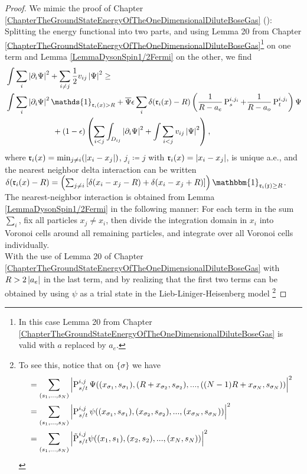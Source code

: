\begin{proof}
	We mimic the proof of Chapter \ref{ChapterTheGroundStateEnergyOfTheOneDimensionalDiluteBoseGas} (\cite{agerskov2022ground}): Splitting the energy functional into two parts, and using Lemma 20 from Chapter \ref{ChapterTheGroundStateEnergyOfTheOneDimensionalDiluteBoseGas}\footnote{In this case Lemma 20 from Chapter \ref{ChapterTheGroundStateEnergyOfTheOneDimensionalDiluteBoseGas} is valid with $a$ replaced by $a_e$.} on one term and Lemma \ref{LemmaDysonSpin1/2Fermi} on the other, we find 
	\begin{equation}
	\begin{aligned}
	&\int \sum_{i}\abs{\partial_i\Psi}^2+\sum_{i\neq j} \frac{1}{2}v_{ij}\abs{\Psi}^2\geq\\ &\int\sum_{i}\abs{\partial_i\Psi}^2\mathds{1}_{\mathfrak{r}_i(x)>R}+\overline{\Psi}\epsilon\sum_{i}\delta(\mathfrak{r}_i(x)-R)\left(\frac{1}{R-a_e}\operatorname{P}_s^{i,j_i}+\frac{1}{R-a_o}\operatorname{P}_t^{i,j_i}\right)\Psi\\&\qquad\qquad\qquad+ (1-\epsilon)\left(\sum_{i<j}\int_{D_{ij}}\abs{\partial_i \Psi}^2+\int\sum_{i<j} v_{ij} \abs{\Psi}^2\right),
	\end{aligned}
	\end{equation}
	where $ \mathfrak{r}_i(x)=\min_{j\neq i}(\left\lvert x_i-x_j \right\rvert) $, $ j_i\coloneqq j $ with $ \mathfrak{r}_i(x)=\left\lvert x_i-x_j \right\rvert $, is unique a.e., and the nearest neighbor delta interaction can be written $\delta(\mathfrak{r}_i(x)-R)=\left(\sum_{j\neq i}\left[\delta(x_i-x_j-R)+\delta(x_i-x_j+R)\right]\right)\mathbbm{1}_{\mathfrak{r_i(x)}\geq R}$. The nearest-neighbor interaction is obtained from Lemma \ref{LemmaDysonSpin1/2Fermi} in the following manner: For each term in the sum $ \sum_{i} $, fix all particles $ x_j\neq x_i $, then divide the integration domain in $ x_i $ into Voronoi cells around all remaining particles, and integrate over all Voronoi cells individually.\\
	With the use of Lemma 20 of Chapter \ref{ChapterTheGroundStateEnergyOfTheOneDimensionalDiluteBoseGas} with $ R>2\left\lvert a_e \right\rvert $ in the last term, and by realizing that the first two terms can be obtained by using $ \psi $ as a trial state in the Lieb-Liniger-Heisenberg model
	\footnote{To see this, notice that on $ \{\sigma\} $ we have \begin{equation*}
			\begin{aligned}
			&=\sum_{(s_1,\ldots, s_N)}\left\lvert \operatorname{P}_{s/t}^{i,j}\Psi((x_{\sigma_1},s_{\sigma_1}),(R+x_{\sigma_2},s_{\sigma_2}),...,((N-1)R+x_{\sigma_N},s_{\sigma_N})) \right\rvert^2\\
			&=\sum_{(s_1,\ldots, s_N)}\left\lvert \operatorname{P}_{s/t}^{i,j}\psi((x_{\sigma_1},s_{\sigma_1}),(x_{\sigma_2},s_{\sigma_2}),...,(x_{\sigma_N},s_{\sigma_N})) \right\rvert^2\\
			&=\sum_{(s_1,\ldots, s_N)}\left\lvert \tilde{\operatorname{P}}_{s/t}^{i,j}\psi((x_1,s_{1}),(x_2,s_{2}),...,(x_N,s_{N})) \right\rvert^2
			\end{aligned}
		\end{equation*}}
	

\end{proof}
